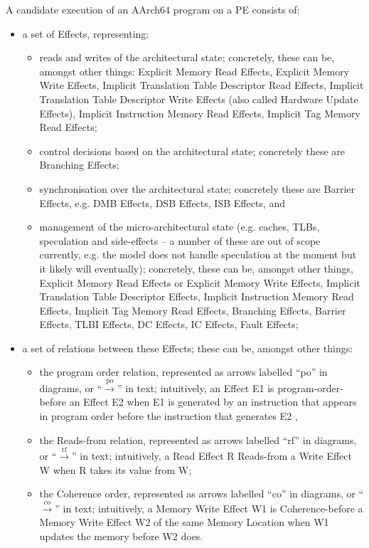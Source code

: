 \documentclass{book}
\begin{document}
A candidate execution of an AArch64 program on a PE consists of:  
\begin{itemize}
\item a set of Effects, representing:  
  \begin{itemize}
  \item reads and writes of the architectural state;
  concretely, these can be, amongst other things:
  Explicit Memory Read Effects, Explicit Memory Write
  Effects, Implicit Translation Table Descriptor Read
  Effects, Implicit Translation Table Descriptor Write
  Effects (also called Hardware Update Effects),
  Implicit Instruction Memory Read Effects, Implicit
  Tag Memory Read Effects; 

  \item control decisions based on the architectural
  state; concretely these are Branching Effects; 

  \item synchronisation over the architectural state;
  concretely these are Barrier Effects, e.g. DMB
  Effects, DSB Effects, ISB Effects, and  

  \item management of the micro-architectural state
  (e.g. caches, TLBs, speculation and side-effects –
  a number of these are out of scope currently, e.g.
  the model does not handle speculation at the moment
  but it likely will eventually); concretely, these
  can be, amongst other things, Explicit Memory Read
  Effects or Explicit Memory Write Effects, Implicit
  Translation Table Descriptor Effects, Implicit
  Instruction Memory Read Effects, Implicit Tag
  Memory Read Effects, Branching Effects, Barrier
  Effects, TLBI Effects, DC Effects, IC Effects, Fault
  Effects; 
  \end{itemize}

\item a set of relations between these Effects; these can be, amongst other things:  
  \begin{itemize}
  \item the program order relation, represented as
  arrows labelled ``po'' in diagrams, or ``$\xrightarrow{\text{po}}$'' in
  text; intuitively, an Effect E1 is
  program-order-before an Effect E2 when E1 is
  generated by an instruction that appears in program
  order before the instruction that generates E2 ,  

  \item the Reads-from relation, represented as
  arrows labelled ``rf'' in diagrams, or ``$\xrightarrow{\text{rf}}$'' in
  text; intuitively, a Read Effect R Reads-from a
  Write Effect W when R takes its value from W; 

  \item the Coherence order, represented as arrows
  labelled ``co'' in diagrams, or ``$\xrightarrow{\text{co}}$'' in text;
  intuitively, a Memory Write Effect W1 is
  Coherence-before a Memory Write Effect W2 of the
  same Memory Location when W1 updates the memory
  before W2 does. 
  \end{itemize}
\end{itemize}
\end{document}

